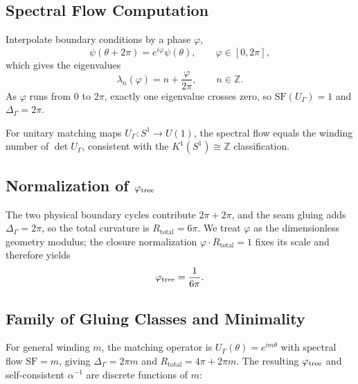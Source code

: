 \subsection{Spectral Flow Computation}
Interpolate boundary conditions by a phase $\varphi$,
\begin{equation}
    \psi(\theta+2\pi)=e^{i\varphi}\psi(\theta), \qquad \varphi\in[0,2\pi],
\end{equation}
which gives the eigenvalues
\begin{equation}
    \lambda_n(\varphi)=n+\frac{\varphi}{2\pi}, \qquad n\in\mathbb{Z}.
\end{equation}
As $\varphi$ runs from $0$ to $2\pi$, exactly one eigenvalue crosses zero, so
$\mathrm{SF}(U_\Gamma)=1$ and $\Delta_\Gamma=2\pi$.

\begin{remark}
For unitary matching maps $U_\Gamma:S^1\to U(1)$, the spectral flow equals the winding
number of $\det U_\Gamma$, consistent with the $K^1(S^1)\cong\mathbb{Z}$ classification.
\end{remark}

\subsection{\texorpdfstring{Normalization of $\varphi_{\mathrm{tree}}$}{Normalization of phi_tree}}
The two physical boundary cycles contribute $2\pi+2\pi$, and the seam gluing adds
$\Delta_\Gamma=2\pi$, so the total curvature is $R_{\text{total}}=6\pi$. We treat $\varphi$
as the dimensionless geometry modulus; the closure normalization
$\varphi\cdot R_{\text{total}}=1$ fixes its scale and therefore yields
\begin{equation}
    \varphi_{\mathrm{tree}} = \frac{1}{6\pi}.
\end{equation}

\subsection{Family of Gluing Classes and Minimality}
\label{sec:gluing-class-scan}

For general winding $m$, the matching operator is $U_\Gamma(\theta)=e^{im\theta}$
with spectral flow $\mathrm{SF}=m$, giving $\Delta_\Gamma=2\pi m$ and
$R_{\text{total}}=4\pi+2\pi m$. The resulting $\varphi_{\mathrm{tree}}$ and self-consistent
$\alpha^{-1}$ are discrete functions of $m$:

